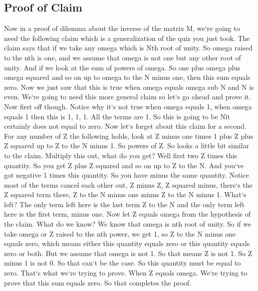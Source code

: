 \subsection{Proof of Claim}
Now in a proof of dilemma about the inverse of the matrix M, we`re going to need the following claim which is a generalization of the quiz you just took.
The claim says that if we take any omega which is Nth root of unity.
So omega raised to the nth is one, and we assume that omega is not one but any other root of unity.
And if we look at the sum of powers of omega.
So one plus omega plus omega squared and so on up to omega to the N minus one, then this sum equals zero.
Now we just saw that this is true when omega equals omega sub N and N is even.
We`re going to need this more general claim so let`s go ahead and prove it.
Now first off though.
Notice why it`s not true when omega equals 1, when omega equals 1 then this is 1, 1, 1.
All the terms are 1.
So this is going to be N\@\. it certainly does not equal to zero.
Now let`s forget about this claim for a second.
For any number of Z the following holds, look at Z minus one times 1 plus Z plus Z squared up to Z to the N minus 1.
So powers of Z\@.
So looks a little bit similar to the claim.
Multiply this out, what do you get? Well first two Z times this quantity.
So you get Z plus Z squared and so on up to Z to the N\@.
And you`ve got negative 1 times this quantity.
So you have minus the same quantity.
Notice most of the terms cancel each other out, Z minus Z, Z squared minus, there`s the Z squared term there, Z to the N minus one minus Z to the N minus 1.
What`s left? The only term left here is the last term Z to the N and the only term left here is the first term, minus one.
Now let Z equals omega from the hypothesis of the claim.
What do we know? We know that omega is nth root of unity.
So if we take omega or Z raised to the nth power, we get 1, so Z to the N minus one equals zero, which means either this quantity equals zero or this quantity equals zero or both.
But we assume that omega is not 1.
So that means Z is not 1.
So Z minus 1 is not 0.
So that can`t be the case.
So this quantity must be equal to zero.
That`s what we`re trying to prove.
When Z equals omega.
We`re trying to prove that this sum equals zero.
So that completes the proof.

